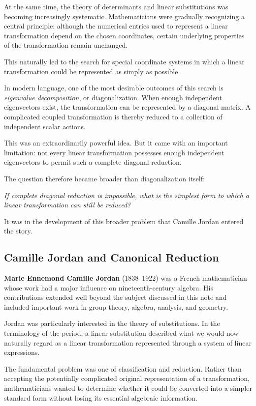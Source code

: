 \documentclass[11pt]{article}
\begin{document}
At the same time, the theory of determinants and linear substitutions
was becoming increasingly systematic.  Mathematicians were gradually
recognizing a central principle: although the numerical entries used
to represent a linear transformation depend on the chosen coordinates,
certain underlying properties of the transformation remain unchanged.

This naturally led to the search for special coordinate systems in
which a linear transformation could be represented as simply as
possible.

In modern language, one of the most desirable outcomes of this search
is \emph{eigenvalue decomposition}, or diagonalization.  When enough
independent eigenvectors exist, the transformation can be represented
by a diagonal matrix.  A complicated coupled transformation is thereby
reduced to a collection of independent scalar actions.

This was an extraordinarily powerful idea.  But it came with an
important limitation: not every linear transformation possesses enough
independent eigenvectors to permit such a complete diagonal reduction.

The question therefore became broader than diagonalization itself:

\begin{center}
\emph{If complete diagonal reduction is impossible, what is the
simplest form to which a linear transformation can still be reduced?}
\end{center}

It was in the development of this broader problem that Camille Jordan
entered the story.

\subsection{Camille Jordan and Canonical Reduction}

\textbf{Marie Ennemond Camille Jordan} (1838--1922) was a French
mathematician whose work had a major influence on nineteenth-century
algebra.  His contributions extended well beyond the subject discussed
in this note and included important work in group theory, algebra,
analysis, and geometry.

Jordan was particularly interested in the theory of substitutions.
In the terminology of the period, a linear substitution described what
we would now naturally regard as a linear transformation represented
through a system of linear expressions.

The fundamental problem was one of classification and reduction.
Rather than accepting the potentially complicated original
representation of a transformation, mathematicians wanted to determine
whether it could be converted into a simpler standard form without
losing its essential algebraic information.
\end{document}
